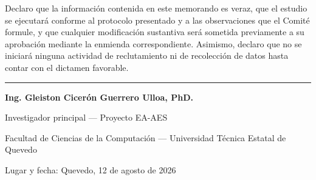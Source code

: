 \documentclass[11pt,a4paper]{article}
\newcommand{\campo}[1]{\rule{#1}{0.4pt}}
\begin{document}
Declaro que la informaci\'on contenida en este memorando es veraz, que el estudio se ejecutar\'a conforme al protocolo presentado y a las observaciones que el Comit\'e formule, y que cualquier modificaci\'on sustantiva ser\'a sometida previamente a su aprobaci\'on mediante la enmienda correspondiente. Asimismo, declaro que no se iniciar\'a ninguna actividad de reclutamiento ni de recolecci\'on de datos hasta contar con el dictamen favorable.

\vspace{28pt}
\campo{7.6cm}

\textbf{Ing. Gleiston Cicer\'on Guerrero Ulloa, PhD.}

{\small Investigador principal --- Proyecto EA-AES}

{\small Facultad de Ciencias de la Computaci\'on --- Universidad T\'ecnica Estatal de Quevedo}

\vspace{10pt}
Lugar y fecha: Quevedo, 12 de agosto de 2026
\end{document}
